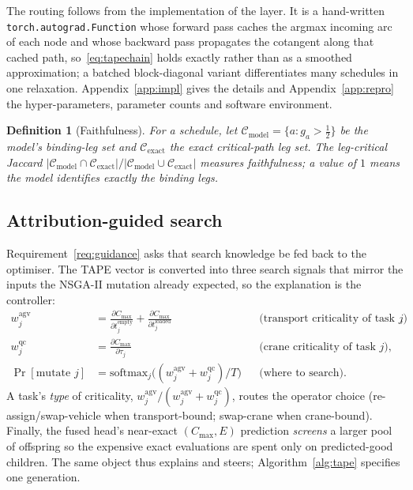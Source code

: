 \documentclass[11pt]{article}
\newtheorem{definition}{Definition}
\newcommand{\Cmax}{C_{\max}}
\begin{document}
The routing follows from the implementation of the layer. It is a hand-written
\texttt{torch.\allowbreak autograd.\allowbreak Function} whose forward pass caches the
argmax incoming arc of each node and whose backward pass propagates the cotangent along that
cached path, so~\eqref{eq:tapechain} holds exactly rather than as a smoothed approximation; a
batched block-diagonal variant differentiates many schedules in one relaxation.
Appendix~\ref{app:impl} gives the details and Appendix~\ref{app:repro} the hyper-parameters,
parameter counts and software environment.

\begin{definition}[Faithfulness]
For a schedule, let $\mathcal{C}_{\text{model}}=\{a:g_a>\tfrac12\}$ be the model's binding-leg
set and $\mathcal{C}_{\text{exact}}$ the exact critical-path leg set. The \emph{leg-critical
Jaccard} $|\mathcal{C}_{\text{model}}\cap\mathcal{C}_{\text{exact}}|/
|\mathcal{C}_{\text{model}}\cup\mathcal{C}_{\text{exact}}|$ measures faithfulness; a value of
$1$ means the model identifies exactly the binding legs.
\end{definition}

\subsection{Attribution-guided search}
\label{sec:guidance}
Requirement~\ref{req:guidance} asks that search knowledge be fed back to the optimiser. The
TAPE vector is converted into three search signals that mirror the inputs the NSGA-II
mutation already expected, so the explanation is the controller:
\begin{align}
w^{\text{agv}}_j &= \tfrac{\partial \Cmax}{\partial t^{\text{empty}}_j}
+ \tfrac{\partial \Cmax}{\partial t^{\text{loaded}}_j}
&&\text{(transport criticality of task $j$)},\\
w^{\text{qc}}_j &= \tfrac{\partial \Cmax}{\partial \tau_j}
&&\text{(crane criticality of task $j$)},\\
\Pr[\text{mutate } j] &= \mathrm{softmax}_j\!\big((w^{\text{agv}}_j+w^{\text{qc}}_j)/T\big)
&&\text{(where to search)} .
\end{align}
A task's \emph{type} of criticality, $w^{\text{agv}}_j/(w^{\text{agv}}_j+w^{\text{qc}}_j)$,
routes the operator choice (re-assign/swap-vehicle when transport-bound; swap-crane when
crane-bound). Finally, the fused head's near-exact $(\Cmax,E)$ prediction \emph{screens} a
larger pool of offspring so the expensive exact evaluations are spent only on
predicted-good children. The same object thus explains and steers; Algorithm~\ref{alg:tape}
specifies one generation.
\end{document}
